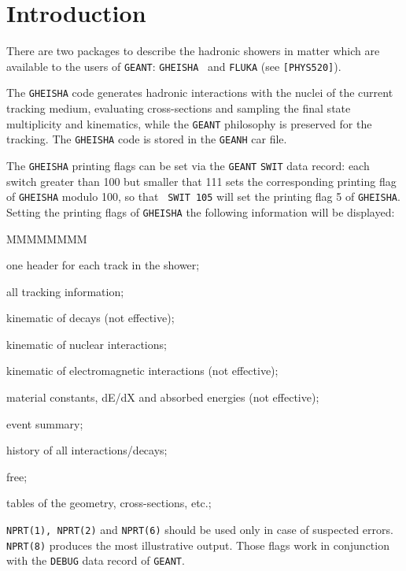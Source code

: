        
\section{Introduction }
 
There are two packages to describe the hadronic showers in matter
which are available to the users of {\tt GEANT}: {\tt GHEISHA}~\cite{bib-GHEI}
and {\tt FLUKA} (see {\tt [PHYS520]}).
 
The {\tt GHEISHA} code generates hadronic interactions with the nuclei of the
current tracking medium, evaluating cross-sections and sampling the final 
state multiplicity and kinematics, while the {\tt GEANT} philosophy is 
preserved for the tracking.
The {\tt GHEISHA} code is stored in the {\tt GEANH} car file.

The {\tt GHEISHA} printing flags can be set via the {\tt GEANT} {\tt SWIT} 
data record:
each switch greater than 100 but smaller that 111 sets the
corresponding printing flag of {\tt GHEISHA} modulo 100, so that {\tt
SWIT 105} will set the printing flag 5 of {\tt GHEISHA}. Setting the
printing flags of {\tt GHEISHA} the following information will be displayed:
\begin{DLtt}{MMMMMMMM}
\item[NPRT(1)]    one header for each track in the shower;
\item[NPRT(2)]    all tracking information;
\item[NPRT(3)]    kinematic of decays (not effective);
\item[NPRT(4)]    kinematic of nuclear interactions;
\item[NPRT(5)]    kinematic of electromagnetic interactions (not effective);
\item[NPRT(6)]    material constants, dE/dX and absorbed energies
                  (not effective);
\item[NPRT(7)]    event summary;
\item[NPRT(8)]    history of all interactions/decays;
\item[NPRT(9)]    free;
\item[NPRT(10)]   tables of the geometry, cross-sections, etc.;
\end{DLtt}
{\tt NPRT(1), NPRT(2)} and {\tt NPRT(6)} should be used only in case  of
suspected errors. {\tt NPRT(8)} produces the most illustrative output. Those
flags work in conjunction with the {\tt DEBUG} data record 
of {\tt GEANT}.
